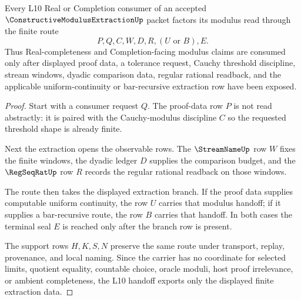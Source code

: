 \begin{theorem}
\label{thm:constructive-modulus-extraction-l10-handoff}
Every L10 Real or Completion consumer of an accepted $\ConstructiveModulusExtractionUp$ packet factors its modulus read through the finite route
$$
P,Q,C,W,D,R,(U \text{ or } B),E .
$$
Thus Real-completeness and Completion-facing modulus claims are consumed only after displayed proof data, a tolerance request, Cauchy threshold discipline, stream windows, dyadic comparison data, regular rational readback, and the applicable uniform-continuity or bar-recursive extraction row have been exposed.
\end{theorem}
\begin{proof}
Start with a consumer request $Q$. The proof-data row $P$ is not read abstractly: it is paired with the Cauchy-modulus discipline $C$ so the requested threshold shape is already finite.

Next the extraction opens the observable rows. The $\StreamNameUp$ row $W$ fixes the finite windows, the dyadic ledger $D$ supplies the comparison budget, and the $\RegSeqRatUp$ row $R$ records the regular rational readback on those windows.

The route then takes the displayed extraction branch. If the proof data supplies computable uniform continuity, the row $U$ carries that modulus handoff; if it supplies a bar-recursive route, the row $B$ carries that handoff. In both cases the terminal seal $E$ is reached only after the branch row is present.

The support rows $H,K,S,N$ preserve the same route under transport, replay, provenance, and local naming. Since the carrier has no coordinate for selected limits, quotient equality, countable choice, oracle moduli, host proof irrelevance, or ambient completeness, the L10 handoff exports only the displayed finite extraction data.
\end{proof}



